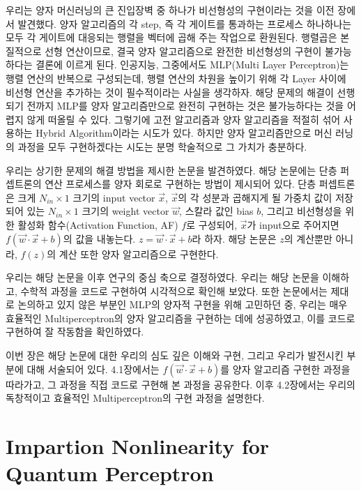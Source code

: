 우리는 양자 머신러닝의 큰 진입장벽 중 하나가 비선형성의 구현이라는 것을 이전 장에서 발견했다.
양자 알고리즘의 각 step, 즉 각 게이트를 통과하는 프로세스 하나하나는 모두 각 게이트에 대응되는 행렬을 벡터에 곱해 주는 작업으로 환원된다. 
행렬곱은 본질적으로 선형 연산이므로, 결국 양자 알고리즘으로 완전한 비선형성의 구현이 불가능하다는 결론에 이르게 된다.
인공지능, 그중에서도 MLP(Multi Layer Perceptron)는 행렬 연산의 반복으로 구성되는데, 행렬 연산의 차원을 높이기 위해 각 Layer 사이에 비선형 연산을 추가하는 것이 필수적이라는 사실을 생각하자.
해당 문제의 해결이 선행되기 전까지 MLP를 양자 알고리즘만으로 완전히 구현하는 것은 불가능하다는 것을 어렵지 않게 떠올릴 수 있다.
그렇기에 고전 알고리즘과 양자 알고리즘을 적절히 섞어 사용하는 Hybrid Algorithm이라는 시도가 있다. 하지만 양자 알고리즘만으로 머신 러닝의 과정을 모두 구현하겠다는 시도는 분명 학술적으로 그 가치가 충분하다.

우리는 상기한 문제의 해결 방법을 제시한 논문을 발견하였다.
해당 논문에는 단층 퍼셉트론의 연산 프로세스를 양자 회로로 구현하는 방법이 제시되어 있다.
단층 퍼셉트론은 크게 \(N_{in} \times 1\) 크기의 input vector \(\vec{x}\), 
\(\vec{x}\)의 각 성분과 곱해지게 될 가중치 값이 저장되어 있는 \(N_{in} \times 1\) 크기의 weight vector \(\vec{w}\), 
스칼라 값인 bias \(b\), 그리고 비선형성을 위한 활성화 함수(Activation Function, AF) \(f\)로 구성되어,
\(\vec{x}\)가 input으로 주어지면 \(f(\vec{w}\cdot\vec{x}+b)\)의 값을 내놓는다.
\(z = \vec{w}\cdot\vec{x}+b\)라 하자.
해당 논문은 \(z\)의 계산뿐만 아니라, \(f(z)\)의 계산 또한 양자 알고리즘으로 구현한다.

우리는 해당 논문을 이후 연구의 중심 축으로 결정하였다.
우리는 해당 논문을 이해하고, 수학적 과정을 코드로 구현하여 시각적으로 확인해 보았다.
또한 논문에서는 제대로 논의하고 있지 않은 부분인 MLP의 양자적 구현을 위해 고민하던 중, 우리는 매우 효율적인 Multiperceptron의 양자 알고리즘을 구현하는 데에 성공하였고, 이를 코드로 구현하여 잘 작동함을 확인하였다.

이번 장은 해당 논문에 대한 우리의 심도 깊은 이해와 구현, 그리고 우리가 발전시킨 부분에 대해 서술되어 있다.
4.1장에서는 \(f(\vec{w}\cdot\vec{x}+b)\)를 양자 알고리즘 구현한 과정을 따라가고, 그 과정을 직접 코드로 구현해 본 과정을 공유한다.
이후 4.2장에서는 우리의 독창적이고 효율적인 Multiperceptron의 구현 과정을 설명한다.

\section{Impartion Nonlinearity for Quantum Perceptron}



